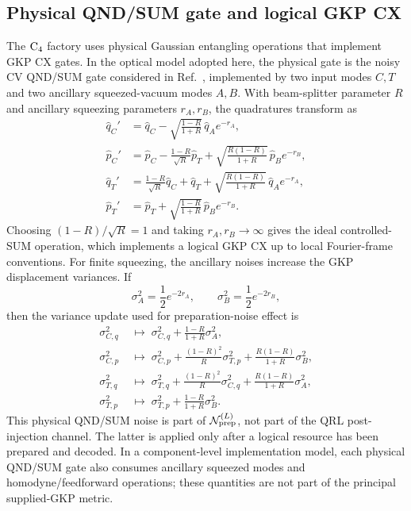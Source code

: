 \documentclass[aps,
prx,
superscriptaddress,
reprint,
longbibliography,
floatfix]{revtex4-2}
\begin{document}
\subsection{Physical QND/SUM gate and logical GKP CX}
\label{app:qnd_cnot_model}

The ${\rm C_4}$ factory uses physical Gaussian entangling operations that implement GKP CX gates. In the optical model adopted here, the physical gate is the noisy CV QND/SUM gate considered in Ref.~\cite{Fukui2023NoisyGKPOptical}, implemented by two input modes $C,T$ and two ancillary squeezed-vacuum modes $A,B$. With beam-splitter parameter $R$ and ancillary squeezing parameters $r_A,r_B$, the quadratures transform as
\begin{align}
\hat q_C'&=\hat q_C-
\sqrt{\frac{1-R}{1+R}}\,\hat q_A e^{-r_A},
\nonumber\\
\hat p_C'&=\hat p_C-
\frac{1-R}{\sqrt R}\hat p_T
+
\sqrt{\frac{R(1-R)}{1+R}}\,\hat p_B e^{-r_B},
\nonumber\\
\hat q_T'&=
\frac{1-R}{\sqrt R}\hat q_C+\hat q_T
+
\sqrt{\frac{R(1-R)}{1+R}}\,\hat q_A e^{-r_A},
\nonumber\\
\hat p_T'&=\hat p_T+
\sqrt{\frac{1-R}{1+R}}\,\hat p_B e^{-r_B}.
\label{eq:noisy_qnd_heisenberg}
\end{align}
Choosing $(1-R)/\sqrt R=1$ and taking $r_A,r_B\to\infty$ gives the ideal controlled-SUM operation, which implements a logical GKP CX up to local Fourier-frame conventions. For finite squeezing, the ancillary noises increase the GKP displacement variances. If
\begin{equation}
\sigma_A^2=\frac12e^{-2r_A},
\qquad
\sigma_B^2=\frac12e^{-2r_B},
\end{equation}
then the variance update used for preparation-noise effect is
\begin{align}
\sigma_{C,q}^{2}\;&\mapsto\;
\sigma_{C,q}^{2}
+
\frac{1-R}{1+R}\sigma_A^2,
\nonumber\\
\sigma_{C,p}^{2}\;&\mapsto\;
\sigma_{C,p}^{2}
+
\frac{(1-R)^2}{R}\sigma_{T,p}^{2}
+
\frac{R(1-R)}{1+R}\sigma_B^2,
\nonumber\\
\sigma_{T,q}^{2}\;&\mapsto\;
\sigma_{T,q}^{2}
+
\frac{(1-R)^2}{R}\sigma_{C,q}^{2}
+
\frac{R(1-R)}{1+R}\sigma_A^2,
\nonumber\\
\sigma_{T,p}^{2}\;&\mapsto\;
\sigma_{T,p}^{2}
+
\frac{1-R}{1+R}\sigma_B^2 .
\label{eq:noisy_qnd_variances}
\end{align}
This physical QND/SUM noise is part of $\mathcal N_{\rm prep}^{(L)}$, not part of the QRL post-injection channel. The latter is applied only after a logical resource has been prepared and decoded. In a component-level implementation model, each physical QND/SUM gate also consumes ancillary squeezed modes and homodyne/feedforward operations; these quantities are not part of the principal supplied-GKP metric.
\end{document}
